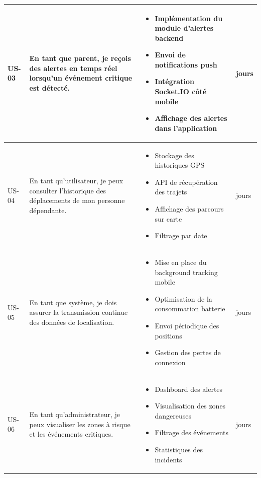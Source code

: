 \begin{longtable}{|>{\centering\arraybackslash}p{}|>{\raggedright\arraybackslash}p{}|>{\raggedright\arraybackslash}p{}|>{\centering\arraybackslash}p{}|}
US-03 & En tant que parent, je reçois des alertes en temps réel lorsqu’un événement critique est détecté.
& \begin{itemize}[leftmargin=*, nosep]
\item Implémentation du module d’alertes backend
\item Envoi de notifications push
\item Intégration Socket.IO côté mobile
\item Affichage des alertes dans l’application
\end{itemize}
& 3 jours \\ \hline

US-04 & En tant qu’utilisateur, je peux consulter l’historique des déplacements de mon personne dépendante.
& \begin{itemize}[leftmargin=*, nosep]
\item Stockage des historiques GPS
\item API de récupération des trajets
\item Affichage des parcours sur carte
\item Filtrage par date
\end{itemize}
& 3 jours \\ \hline

US-05 & En tant que système, je dois assurer la transmission continue des données de localisation.
& \begin{itemize}[leftmargin=*, nosep]
\item Mise en place du background tracking mobile
\item Optimisation de la consommation batterie
\item Envoi périodique des positions
\item Gestion des pertes de connexion
\end{itemize}
& 3 jours \\ \hline

US-06 & En tant qu’administrateur, je peux visualiser les zones à risque et les événements critiques.
& \begin{itemize}[leftmargin=*, nosep]
\item Dashboard des alertes
\item Visualisation des zones dangereuses
\item Filtrage des événements
\item Statistiques des incidents
\end{itemize}
& 2 jours \\ \hline

\end{longtable}
